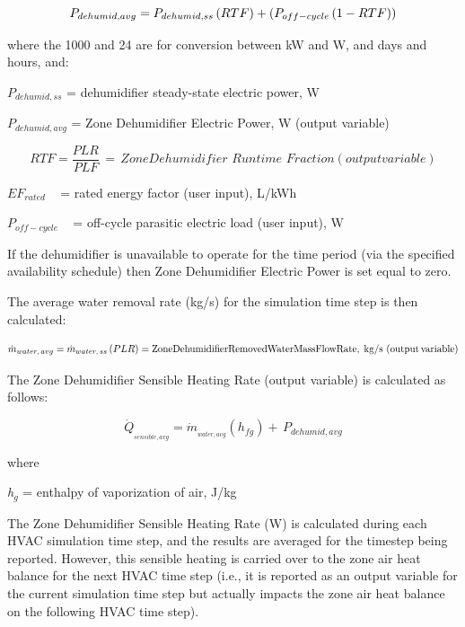 \begin{equation}
  P_{dehumid,avg} = P_{dehumid,ss} \PB{RTF} + \PB{P_{off-cycle}\PB{1 - RTF}}
\end{equation}

where the 1000 and 24 are for conversion between kW and W, and days and hours, and:

\({P_{dehumid,ss}}\) = dehumidifier steady-state electric power, W

\({P_{dehumid,avg}}\) = Zone Dehumidifier Electric Power, W (output variable)

\begin{equation}
RTF = \frac{{PLR}}{{PLF}}\, = \,Zone Dehumidifier\,\,Runtime\,\,Fraction (output variable)
\end{equation}

\(E{F_{rated}}\) ~ = rated energy factor (user input), L/kWh

\({P_{off - cycle}}\) ~ = off-cycle parasitic electric load (user input), W

If the dehumidifier is unavailable to operate for the time period (via the specified availability schedule) then Zone Dehumidifier Electric Power is set equal to zero.

The average water removal rate (kg/s) for the simulation time step is then calculated:

\begin{equation}
{\dot m_{water,\,avg}} = {\dot m_{water,\,ss}}\left( {PLR} \right) = {\rm{Zone Dehumidifier Removed Water Mass Flow Rate}},\;{\rm{kg/s}}\,\left( {{\rm{output}}\,{\rm{variable}}} \right)
\end{equation}

The Zone Dehumidifier Sensible Heating Rate (output variable) is calculated as follows:

\begin{equation}
{\dot Q_{_{sensible,avg}}} = {\dot m_{_{water,avg}}}\left( {{h_{fg}}} \right) + \,{P_{dehumid,avg}}
\end{equation}

where

\emph{h\(_{g}\)} = enthalpy of vaporization of air, J/kg

The Zone Dehumidifier Sensible Heating Rate (W) is calculated during each HVAC simulation time step, and the results are averaged for the timestep being reported. However, this sensible heating is carried over to the zone air heat balance for the next HVAC time step (i.e., it is reported as an output variable for the current simulation time step but actually impacts the zone air heat balance on the following HVAC time step).

